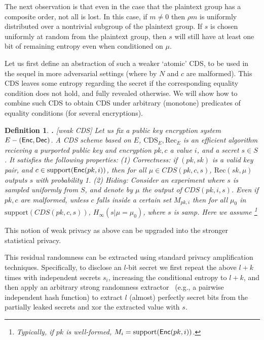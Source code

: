 \documentclass{article}
\newcommand{\support}{{\mathrm{support}}}
\newtheorem{DEFINITION}{Definition}[section]
\newenvironment{definition}{\begin{DEFINITION} \hspace{-.85em} {\bf .} \rm}%
	{\end{DEFINITION}}
\newcommand{\enc}{{\sf Enc}}
\newcommand{\dec}{{\sf Dec}}
\begin{document}
The next observation is that even in the case that the plaintext
group has a composite order, not all is lost. In this case, if
$m\neq 0$ then $\rho m$ is uniformly distributed over a nontrivial
subgroup of the plaintext group. If $s$ is chosen uniformly at
random from the plaintext group, then $s$ will still have at least
one bit of remaining entropy even when conditioned on $\mu$.
 
Let us first define an abstraction of such a weaker `atomic' CDS, to be used in the sequel in more adversarial settings (where by $N$ and $c$ are malformed). This CDS leaves some entropy regarding the secret if the corresponding equality condition does not hold, and fully revealed otherwise. We will show how to combine such CDS to obtain CDS under arbitrary (monotone) predicates of equality conditions (for several encryptions).

\begin{definition}[weak CDS]
	Let us fix a public key encryption system $E-(\enc,\dec)$. A CDS scheme based on $E$, $\text{CDS}_E,\text{Rec}_E$ is an efficient algorithm recieving a purported public key and encryption $pk,c$ a value $i$, and a secret $s\in S$. It satisfies the following properties:
	(1) Correctness: if $(pk,sk)$ is a valid key pair, and $c\in \support(\enc(pk,i))$, then for all $\mu \in CDS(pk,c,s)$, $\text{Rec}(sk,\mu)$ outputs $s$ with probability 1.
	(2) Hiding: Consider an experiment where $s$ is sampled uniformly from $S$, and denote by $\mu$ the output of $CDS(pk,i,s)$. Even if $pk,c$ are malformed, unless $c$ falls inside a certain set $M_{pk,i}$ then for all $\mu_0$ in $\support(CDS(pk,c,s))$, $H_\infty(s|\mu = \mu_0)$, where $s$ is samp. Here we assume
	\footnote{Typically, if $pk$ is well-formed, $M_i=\support(\enc(pk,i))$.} 
\end{definition} 

This notion of weak privacy as above can be upgraded into the stronger statistical privacy.  


This residual randomness can be extracted using standard privacy
amplification techniques. Specifically, to disclose an $l$-bit
secret we first repeat the above $l+k$ times with independent
secrets $s_i$, increasing the conditional entropy to $l+k$, and
then apply an arbitrary strong randomness extractor~\cite{NZ}
(e.g., a pairwise independent hash function\cite{BBR,ILL,BBCM}) to
extract $l$ (almost) perfectly secret bits from the partially leaked secrets and xor 
the extracted value with $s$. 
\end{document}
